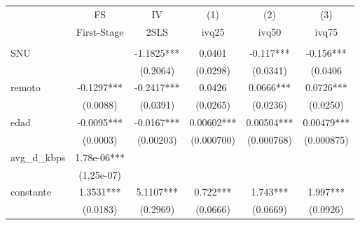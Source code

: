 \begin{tabular}{lccccc} \hline
 &FS & IV & (1) & (2) & (3) \\
 &First-Stage & 2SLS & ivq25 & ivq50 & ivq75 \\ \hline
 & &  &  & & \\
SNU & & -1.1825*** &0.0401 & -0.117*** & -0.156*** \\
 & & (0.2064) &(0.0298) & (0.0341) & (0.0406 \\
remoto & -0.1297*** &  -0.2417*** & 0.0426 & 0.0666*** & 0.0726*** \\
 & (0.0088) & (0.0391) &(0.0265) & (0.0236) & (0.0250) \\
edad & -0.0095*** & -0.0167*** & 0.00602*** & 0.00504*** & 0.00479*** \\
 & (0.0003) & (0.00203) & (0.000700) & (0.000768) & (0.000875) \\
avg\_d\_kbps &  1.78e-06*** & & & & \\
& (1,25e-07) & & & &   \\
constante & 1.3531*** & 5.1107*** & 0.722*** & 1.743*** & 1.997*** \\
 & (0.0183) & (0.2969) & (0.0666) & (0.0669) & (0.0926) \\
  \hline
\end{tabular}